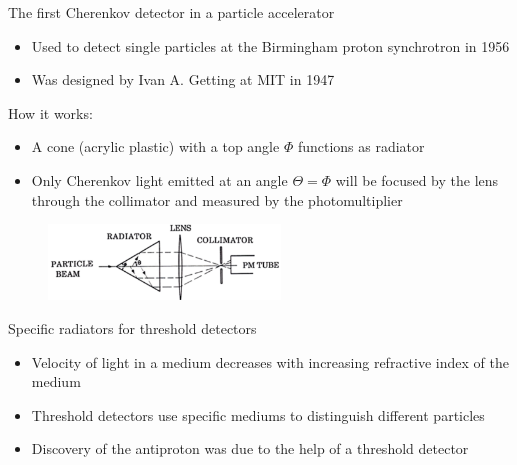 \documentclass[aspectratio=1610, 10pt]{beamer}
\begin{document}
\begin{frame}{The first Cherenkov detector in a particle accelerator}
  \begin{itemize}
    \item Used to detect single particles at the Birmingham proton synchrotron in 1956
    \medskip
    \item Was designed by Ivan A. Getting at MIT in 1947
  \end{itemize}

How it works:
\begin{itemize}
  \item A cone (acrylic plastic) with a top angle $\Phi$ functions as radiator
  \medskip
  \item Only Cherenkov light emitted at an angle $\Theta = \Phi$ will be focused by the lens through the collimator and measured by the
  photomultiplier
\end{itemize}
\begin{figure}
  \includegraphics[width=0.55\textwidth]{images/the_second.png}
\end{figure}
\end{frame}

\begin{frame}{Specific radiators for threshold detectors}
  \begin{itemize}
    \item Velocity of light in a medium decreases with increasing refractive index of the medium
    \medskip
    \item Threshold detectors use specific mediums to distinguish different particles
    \medskip
    \item Discovery of the antiproton was due to the help of a threshold detector
  \end{itemize}
\end{frame}
\end{document}
